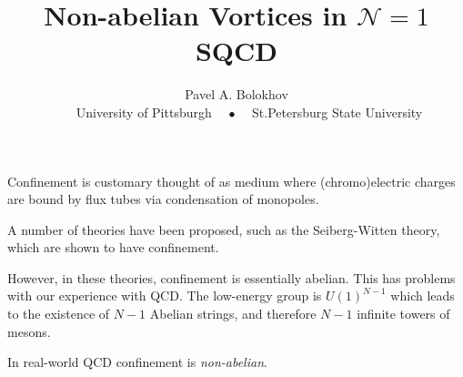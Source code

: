 \documentclass[12pt,letterpaper,landscape,KOMA,smallheadings,calcdimensions,display]{powersem}
\begin{document}
\begin{slide}
%
\vspace*{\fill}
\title{Non-abelian Vortices in $\mathcal{N}=1$ SQCD}
\author{Pavel A. Bolokhov\\
\tiny
~~~~University of Pittsburgh ~~$\bullet$~~ St.Petersburg State University}
\date{}
\maketitle
\vspace*{\fill}
\end{slide}


\begin{slide}
	{
	Confinement is customary thought of as medium where (chromo)electric charges are
	bound by flux tubes via condensation of monopoles. 
	}

	{
	A number of theories have been proposed, such as the Seiberg-Witten theory, which
	are shown to have confinement.
	}

	{
	However, in these theories, confinement is essentially abelian.
	This has problems with our experience with QCD.
	The low-energy group is $ U(1)^{N-1} $ which leads to the existence of $ N-1 $ Abelian
	strings, and therefore $ N-1 $ infinite towers of mesons. 
	}

	{
	In real-world QCD confinement is \emph{non-abelian}.
	}

\end{slide}
\end{document}
